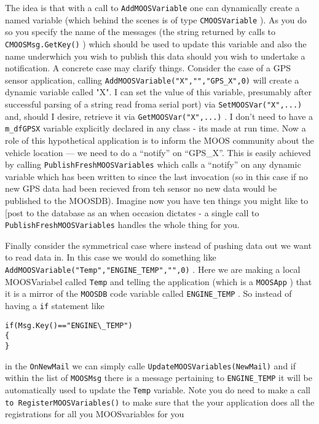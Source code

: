 \documentclass[a4paper,10pt]{article}
\newcommand{\Code}[1]{\texttt{#1} }
\newcommand{\code}[1]{\Code{#1} }
\begin{document}
The idea is that with a call to \code{AddMOOSVariable} one can dynamically create a named variable (which behind the scenes is of type \code{CMOOSVariable}). As you do so you specify the name of the messages (the string returned by calls to \code{CMOOSMsg.GetKey()}) which should be used to update this variable and also the name underwhich you wish to publish this data should you wish to undertake a notification. A concrete case may clarify things. Consider the case of a GPS sensor application, calling \code{AddMOOSVariable("X","","GPS\_X",0)} will create a dynamic variable called "X". I can set the value of this variable, presumably after successful parsing of a string read froma  serial port) via \code{SetMOOSVar("X",...)} and, should I desire, retrieve it via \code{GetMOOSVar("X",...)}. I don't need to have a \code{m\_dfGPSX} variable explicitly declared in any class - its made at run time. Now a role of this hypothetical application is to inform the MOOS community about the vehicle location --- we need to do a ``notify'' on ``GPS\_X''. This is easily achieved by calling \code{PublishFreshMOOSVariables} which calls a ``notify'' on any dynamic variable which has been written to since the last invocation (so in this case if no new GPS data had been recieved from teh sensor no new data would be published to the MOOSDB). Imagine now you have ten things you might like to [post to the database as an when occasion dictates - a single call to \code{PublishFreshMOOSVariables} handles the whole thing for you.

Finally consider the symmetrical case where instead of pushing data out we want to read data in. In this case we would do something like \code{AddMOOSVariable("Temp","ENGINE\_TEMP","",0)}. Here we are making a local MOOSVariabel called \code{Temp} and telling the application (which is a \code{MOOSApp}) that it is a mirror of the \code{MOOSDB} code variable called \code{ENGINE\_TEMP}. So instead of having a \code{if} statement like
\begin{lstlisting}
if(Msg.Key()=="ENGINE\_TEMP")
{
}
\end{lstlisting}
 in the \code{OnNewMail} we can simply calle \code{UpdateMOOSVariables(NewMail)} and if within the list of \code{MOOSMsg} there is a message pertaining to \code{ENGINE\_TEMP} it will be automatically used to update the \code{Temp} variable. Note you do need to make a call \code{to RegisterMOOSVariables()} to make sure that the your application does all the registrations for all you MOOSvariables for you
\end{document}
